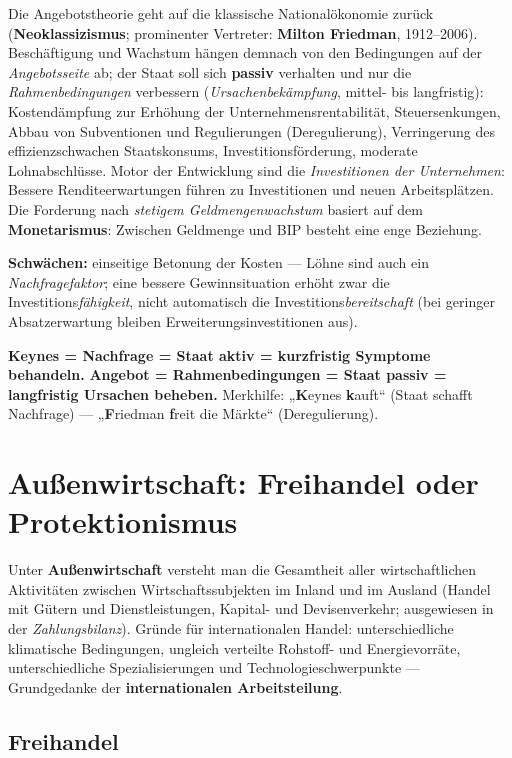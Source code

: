 \documentclass[11pt, a4paper]{article}
\begin{document}
Die Angebotstheorie geht auf die klassische Nationalökonomie zurück
(\textbf{Neoklassizismus}; prominenter Vertreter: \textbf{Milton Friedman}, 1912--2006).
Beschäftigung und Wachstum hängen demnach von den Bedingungen auf der
\emph{Angebotsseite} ab; der Staat soll sich \textbf{passiv} verhalten und nur die
\emph{Rahmenbedingungen} verbessern (\emph{Ursachenbekämpfung}, mittel- bis langfristig):
Kostendämpfung zur Erhöhung der Unternehmensrentabilität, Steuersenkungen, Abbau von
Subventionen und Regulierungen (Deregulierung), Verringerung des effizienzschwachen
Staatskonsums, Investitionsförderung, moderate Lohnabschlüsse. Motor der Entwicklung sind
die \emph{Investitionen der Unternehmen}: Bessere Renditeerwartungen führen zu
Investitionen und neuen Arbeitsplätzen. Die Forderung nach \emph{stetigem
Geldmengenwachstum} basiert auf dem \textbf{Monetarismus}: Zwischen Geldmenge und BIP
besteht eine enge Beziehung.

\textbf{Schwächen:} einseitige Betonung der Kosten --- Löhne sind auch ein
\emph{Nachfragefaktor}; eine bessere Gewinnsituation erhöht zwar die
Investitions\emph{fähigkeit}, nicht automatisch die Investitions\emph{bereitschaft} (bei
geringer Absatzerwartung bleiben Erweiterungsinvestitionen aus).

\begin{eselsbruecke}
\textbf{Keynes = Nachfrage = Staat aktiv = kurzfristig Symptome behandeln.}
\textbf{Angebot = Rahmenbedingungen = Staat passiv = langfristig Ursachen beheben.}
Merkhilfe: „\textbf{K}eynes \textbf{k}auft`` (Staat schafft Nachfrage) ---
„\textbf{F}riedman \textbf{f}reit die Märkte`` (Deregulierung).
\end{eselsbruecke}

\section{Außenwirtschaft: Freihandel oder Protektionismus}

Unter \textbf{Außenwirtschaft} versteht man die Gesamtheit aller wirtschaftlichen
Aktivitäten zwischen Wirtschaftssubjekten im Inland und im Ausland (Handel mit Gütern und
Dienstleistungen, Kapital- und Devisenverkehr; ausgewiesen in der \emph{Zahlungsbilanz}).
Gründe für internationalen Handel: unterschiedliche klimatische Bedingungen, ungleich
verteilte Rohstoff- und Energievorräte, unterschiedliche Spezialisierungen und
Technologieschwerpunkte --- Grundgedanke der \textbf{internationalen Arbeitsteilung}.

\subsection{Freihandel}
\end{document}
